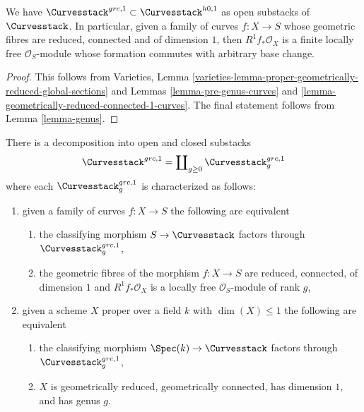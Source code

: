\begin{lemma}
\label{lemma-geomredcon-in-h0-1}
We have $\Curvesstack^{grc, 1} \subset \Curvesstack^{h0, 1}$
as open substacks of $\Curvesstack$. In particular, given
a family of curves $f : X \to S$
whose geometric fibres are reduced, connected and of dimension $1$, then
$R^1f_*\mathcal{O}_X$ is a finite locally free $\mathcal{O}_S$-module
whose formation commutes with arbitrary base change.
\end{lemma}

\begin{proof}
This follows from Varieties, Lemma
\ref{varieties-lemma-proper-geometrically-reduced-global-sections}
and Lemmas \ref{lemma-pre-genus-curves} and
\ref{lemma-geometrically-reduced-connected-1-curves}.
The final statement follows from Lemma \ref{lemma-genus}.
\end{proof}

\begin{lemma}
\label{lemma-one-piece-per-genus}
There is a decomposition into open and closed substacks
$$
\Curvesstack^{grc, 1} = \coprod\nolimits_{g \geq 0} \Curvesstack^{grc, 1}_g
$$
where each $\Curvesstack^{grc, 1}_g$ is characterized as follows:
\begin{enumerate}
\item given a family of curves $f : X \to S$ the following are equivalent
\begin{enumerate}
\item the classifying morphism $S \to \Curvesstack$ factors
through $\Curvesstack^{grc, 1}_g$,
\item the geometric fibres of the morphism $f : X \to S$ are
reduced, connected, of dimension $1$ and
$R^1f_*\mathcal{O}_X$ is a locally free $\mathcal{O}_S$-module
of rank $g$,
\end{enumerate}
\item given a scheme $X$ proper over a field $k$ with $\dim(X) \leq 1$
the following are equivalent
\begin{enumerate}
\item the classifying morphism $\Spec(k) \to \Curvesstack$ factors
through $\Curvesstack^{grc, 1}_g$,
\item $X$ is geometrically reduced, geometrically connected,
has dimension $1$, and has genus $g$.
\end{enumerate}
\end{enumerate}
\end{lemma}

